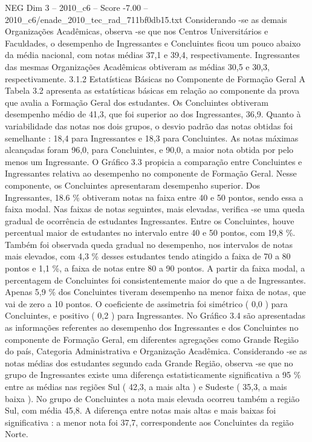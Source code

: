 \begin{textsample}{NEG Dim 3 – 2010\_c6 – Score -7.00 – 2010\_c6/enade\_2010\_tec\_rad\_711bf0db15.txt}
Considerando -se as demais Organizações Acadêmicas, observa -se que nos Centros Universitários e Faculdades, o desempenho de Ingressantes e Concluintes ficou um pouco abaixo da média nacional, com notas médias 37,1 e 39,4, respectivamente.
Ingressantes das mesmas Organizações Acadêmicas obtiveram as médias 30,5 e 30,3, respectivamente. 3.1.2 Estatísticas Básicas no Componente de Formação Geral A Tabela 3.2 apresenta as estatísticas básicas em relação ao componente da prova que avalia a Formação Geral dos estudantes.
Os Concluintes obtiveram desempenho médio de 41,3, que foi superior ao dos Ingressantes, 36,9.
Quanto à variabilidade das notas nos dois grupos, o desvio padrão das notas obtidas foi semelhante : 18,4 para Ingressantes e 18,3 para Concluintes.
As notas máximas alcançadas foram 96,0, para Concluintes, e 90,0, a maior nota obtida por pelo menos um Ingressante.
O Gráfico 3.3 propicia a comparação entre Concluintes e Ingressantes relativa ao desempenho no componente de Formação Geral.
Nesse componente, os Concluintes apresentaram desempenho superior.
Dos Ingressantes, 18.6 \% obtiveram notas na faixa entre 40 e 50 pontos, sendo essa a faixa modal.
Nas faixas de notas seguintes, mais elevadas, verifica -se uma queda gradual de ocorrência de estudantes Ingressantes.
Entre os Concluintes, houve percentual maior de estudantes no intervalo entre 40 e 50 pontos, com 19,8 \%.
Também foi observada queda gradual no desempenho, nos intervalos de notas mais elevados, com 4,3 \% desses estudantes tendo atingido a faixa de 70 a 80 pontos e 1,1 \%, a faixa de notas entre 80 a 90 pontos.
A partir da faixa modal, a percentagem de Concluintes foi consistentemente maior do que a de Ingressantes.
Apenas 5,9 \% dos Concluintes tiveram desempenho na menor faixa de notas, que vai de zero a 10 pontos.
O coeficiente de assimetria foi simétrico ( 0,0 ) para Concluintes, e positivo ( 0,2 ) para Ingressantes.
No Gráfico 3.4 são apresentadas as informações referentes ao desempenho dos Ingressantes e dos Concluintes no componente de Formação Geral, em diferentes agregações como Grande Região do país, Categoria Administrativa e Organização Acadêmica.
Considerando -se as notas médias dos estudantes segundo cada Grande Região, observa -se que no grupo de Ingressantes existe uma diferença estatisticamente significativa a 95 \% entre as médias nas regiões Sul ( 42,3, a mais alta ) e Sudeste ( 35,3, a mais baixa ).
No grupo de Concluintes a nota mais elevada ocorreu também a região Sul, com média 45,8.
A diferença entre notas mais altas e mais baixas foi significativa : a menor nota foi 37,7, correspondente aos Concluintes da região Norte.

\end{textsample}
